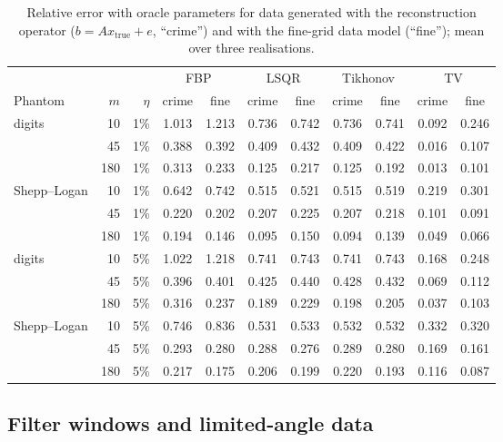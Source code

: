\documentclass[11pt,a4paper]{article}
\numberwithin{equation}{section}
\theoremstyle{remark}
\newcommand{\xt}{x_{\mathrm{true}}}
\begin{document}
\begin{table}[t]
\centering
\caption{Relative error with oracle parameters for data generated with the reconstruction operator ($b=A\xt+e$, ``crime'') and with the fine-grid data model (``fine''); mean over three realisations.}\label{tab:crime}
\small
\setlength{\tabcolsep}{4.5pt}
\begin{tabular}{lrr cc cc cc cc}
\toprule
 & & & \multicolumn{2}{c}{FBP} & \multicolumn{2}{c}{LSQR} & \multicolumn{2}{c}{Tikhonov} & \multicolumn{2}{c}{TV} \\
\cmidrule(lr){4-5}\cmidrule(lr){6-7}\cmidrule(lr){8-9}\cmidrule(lr){10-11}
Phantom & $m$ & $\eta$ & crime & fine & crime & fine & crime & fine & crime & fine \\
\midrule
digits & 10 & 1\% & 1.013 & 1.213 & 0.736 & 0.742 & 0.736 & 0.741 & 0.092 & 0.246 \\
 & 45 & 1\% & 0.388 & 0.392 & 0.409 & 0.432 & 0.409 & 0.422 & 0.016 & 0.107 \\
 & 180 & 1\% & 0.313 & 0.233 & 0.125 & 0.217 & 0.125 & 0.192 & 0.013 & 0.101 \\
Shepp--Logan & 10 & 1\% & 0.642 & 0.742 & 0.515 & 0.521 & 0.515 & 0.519 & 0.219 & 0.301 \\
 & 45 & 1\% & 0.220 & 0.202 & 0.207 & 0.225 & 0.207 & 0.218 & 0.101 & 0.091 \\
 & 180 & 1\% & 0.194 & 0.146 & 0.095 & 0.150 & 0.094 & 0.139 & 0.049 & 0.066 \\
\midrule
digits & 10 & 5\% & 1.022 & 1.218 & 0.741 & 0.743 & 0.741 & 0.743 & 0.168 & 0.248 \\
 & 45 & 5\% & 0.396 & 0.401 & 0.425 & 0.440 & 0.428 & 0.432 & 0.069 & 0.112 \\
 & 180 & 5\% & 0.316 & 0.237 & 0.189 & 0.229 & 0.198 & 0.205 & 0.037 & 0.103 \\
Shepp--Logan & 10 & 5\% & 0.746 & 0.836 & 0.531 & 0.533 & 0.532 & 0.532 & 0.332 & 0.320 \\
 & 45 & 5\% & 0.293 & 0.280 & 0.288 & 0.276 & 0.289 & 0.280 & 0.169 & 0.161 \\
 & 180 & 5\% & 0.217 & 0.175 & 0.206 & 0.199 & 0.220 & 0.193 & 0.116 & 0.087 \\
\bottomrule
\end{tabular}
\end{table}

\subsection{Filter windows and limited-angle data}\label{sec:results-supp}
\end{document}
